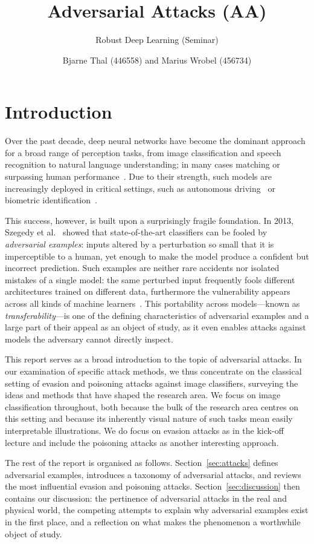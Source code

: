 \documentclass[review]{AIM_report}
\title{Adversarial Attacks (AA)}
\subtitle{Robust Deep Learning (Seminar)}
\author{Bjarne Thal (446558) and Marius Wrobel (456734)}
\institute{RWTH Aachen University, Germany\\
\email{$\{$bjarne.thal, marius.wrobel$\}$@rwth-aachen.de}}
\begin{document}
\maketitle
\section{Introduction}
\label{sec:intro}

Over the past decade, deep neural networks have become the dominant approach for a broad range of perception tasks, from image classification and speech recognition to natural language understanding; in many cases matching or surpassing human performance~\cite{lecun2015deep, he2015delving}. Due to their strength, such models are increasingly deployed in critical settings, such as autonomous driving~\cite{grigorescu2020survey}  or biometric identification~\cite{schroff2015facenet}.

This success, however, is built upon a surprisingly fragile foundation. In 2013, Szegedy et al.\ \cite{szegedy2013intriguing} showed that state-of-the-art classifiers can be fooled by \textit{adversarial examples}: inputs altered by a perturbation so small that it is imperceptible to a human, yet enough to make the model produce a confident but incorrect prediction. Such examples are neither rare accidents nor isolated mistakes of a single model: the same perturbed input frequently fools different architectures trained on different data, furthermore the vulnerability appears across all kinds of machine learners~\cite{goodfellow2014explaining, biggio2018wild}. This portability across models---known as \textit{transferability}---is one of the defining characteristics of adversarial examples and a large part of their appeal as an object of study, as it even enables attacks against models the adversary cannot directly inspect.

This report serves as a broad introduction to the topic of adversarial attacks. In our examination of specific attack methods, we thus concentrate on the classical setting of evasion and poisoning attacks against image classifiers, surveying the ideas and methods that have shaped the research area. We focus on image classification throughout, both because the bulk of the research area centres on this setting and because its inherently visual nature of such tasks mean easily interpretable illustrations. We do focus on evasion attacks as in the kick-off lecture and include the poisoning attacks as another interesting approach. 

The rest of the report is organised as follows. Section~\ref{sec:attacks} defines adversarial examples, introduces a taxonomy of adversarial attacks, and reviews the most influential evasion and poisoning attacks. Section~\ref{sec:discussion} then contains our discussion: the pertinence of adversarial attacks in the real and physical world, the competing attempts to explain why adversarial examples exist in the first place, and a reflection on what makes the phenomenon a worthwhile object of study.
\end{document}
